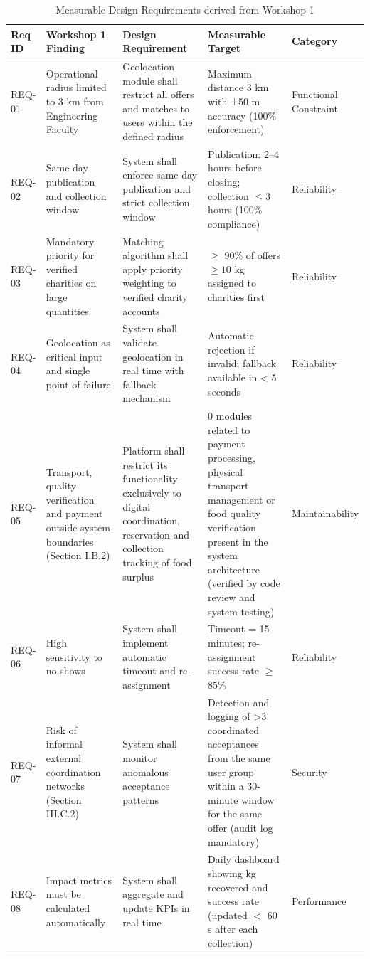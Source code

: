 \documentclass[12pt]{article}
\begin{document}
\begin{longtable}{p{1.5cm} p{3cm} p{4cm} p{4cm} p{2cm} }
\caption{Measurable Design Requirements derived from Workshop 1}
\label{tab:requirements}\\
\toprule
\textbf{Req ID} & \textbf{Workshop 1 Finding} & \textbf{Design Requirement} & \textbf{Measurable Target} & \textbf{Category} \\
\midrule
REQ-01 & Operational radius limited to 3 km from Engineering Faculty & Geolocation module shall restrict all offers and matches to users within the defined radius & Maximum distance 3 km with ±50 m accuracy (100\% enforcement) & Functional Constraint \\
REQ-02 & Same-day publication and collection window & System shall enforce same-day publication and strict collection window             & Publication: 2–4 hours before closing; collection  $\leq 3$ hours (100\% compliance) & Reliability \\
REQ-03 & Mandatory priority for verified charities on large quantities & Matching algorithm shall apply priority weighting to verified charity accounts & $\geq $ 90\% of offers $\geq 10$ kg assigned to charities first & Reliability \\
REQ-04 & Geolocation as critical input and single point of failure & System shall validate geolocation in real time with fallback mechanism & Automatic rejection if invalid; fallback available in < 5 seconds & Reliability \\
REQ-05 & Transport, quality verification and payment outside system boundaries (Section I.B.2) & Platform shall restrict its functionality exclusively to digital coordination, reservation and collection tracking of food surplus & 0 modules related to payment processing, physical transport management or food quality verification present in the system architecture (verified by code review and system testing) & Maintainability \\
REQ-06 & High sensitivity to no-shows & System shall implement automatic timeout and re-assignment & Timeout = 15 minutes; re-assignment success rate $≥$ 85\% & Reliability\\
REQ-07 & Risk of informal external coordination networks (Section III.C.2) & System shall monitor anomalous acceptance patterns & Detection and logging of >3 coordinated acceptances from the same user group within a 30-minute window for the same offer (audit log mandatory) & Security \\
REQ-08 & Impact metrics must be calculated automatically & System shall aggregate and update KPIs in real time & Daily dashboard showing kg recovered and success rate  (updated $<$ 60 s after each collection) & Performance \\

\end{longtable}
\end{document}
